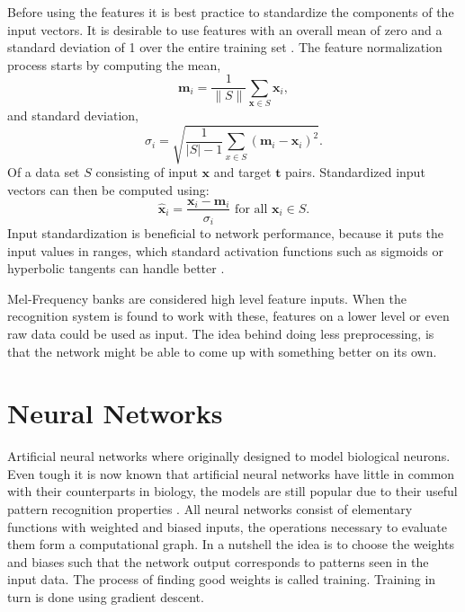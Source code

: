 Before using the features it is best practice to standardize the components of the input vectors. It is desirable to use features with an overall mean of zero and a standard deviation of 1 over the entire training set \cite[page 30]{Graves2008}. The feature normalization process starts by computing the mean,
\begin{equation}
\mathbf{m}_i = \frac{1}{\|S\|} \sum\limits_{\mathbf{x} \in S} \mathbf{x}_i,
\end{equation}
and standard deviation,
\begin{equation}
\sigma_i = \sqrt{\frac{1}{|S| - 1}\sum\limits_{x \in S}(\mathbf{m}_i - \mathbf{x}_i)^2}.
\end{equation}
Of a data set $S$ consisting of input $\mathbf{x}$ and target $\mathbf{t}$ pairs. Standardized input vectors can then be computed using:
\begin{equation}
\hat{\mathbf{x}}_i = \frac{\mathbf{x}_i - \mathbf{m}_i}{\sigma_i} \text{  for all } \mathbf{x}_i \in S.
\end{equation}
Input standardization is beneficial to network performance, because it puts the input values in ranges, which standard activation functions such as sigmoids or hyperbolic tangents can handle better \cite[page 30]{Graves2008}.

Mel-Frequency banks are considered high level feature inputs. When the recognition system is found to work with these, features on a lower level or even raw data could be used as input. The idea behind doing less preprocessing, is that the network might be able to come up with something better on its own.

\section{Neural Networks}
Artificial neural networks where originally designed to model biological neurons. Even tough it is now known that artificial neural networks have little in common with their counterparts in biology, the models are still popular due to their useful pattern recognition properties \cite[page 13]{Graves2008}. All neural networks consist of elementary functions with weighted and biased inputs, the operations necessary to evaluate them form a computational graph. In a nutshell the idea is to choose the weights and biases such that the network output corresponds to patterns seen in the input data. The process of finding good weights is called training. Training in turn is done using gradient descent.

